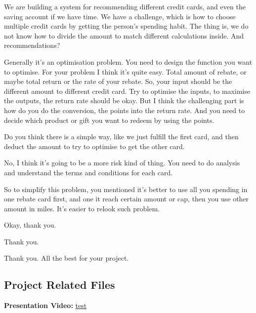\begin{description}[leftmargin=4em,style=nextline]
	\item[JH:] We are building a system for recommending different credit cards, and even the saving account if we have time. We have a challenge, which is how to choose multiple credit cards by getting the person’s spending habit. The thing is, we do not know how to divide the amount to match different calculations inside. And recommendations?

	\item[HJ:] Generally it’s an optimisation problem. You need to design the function you want to optimise. For your problem I think it’s quite easy. Total amount of rebate, or maybe total return or the rate of your rebate. So, your input should be the different amount to different credit card.  Try to optimise the inputs, to maximise the outputs, the return rate should be okay. But I think the challenging part is how do you do the conversion, the points into the return rate. And you need to decide which product or gift you want to redeem by using the points.

	\item[JH:] Do you think there is a simple way, like we just fulfill the first card, and then deduct the amount to try to optimise to get the other card.

	\item[HJ:] No, I think it’s going to be a more risk kind of thing. You need to do analysis and understand the terms and conditions for each card.

	\item[JH:] So to simplify this problem, you mentioned it’s better to use all you spending in one rebate card first, and one it reach certain amount or cap, then you use other amount in miles. It’s easier to relook such problem.

	\item[JH:] Okay, thank you.

	\item[LD:] Thank you.

	\item[HJ:] Thank you. All the best for your project.

\end{description}

\clearpage{}

\subsection{Project Related Files} %
\label{sub:project_related_files}
	\textbf{Presentation Video:} \url{test}

